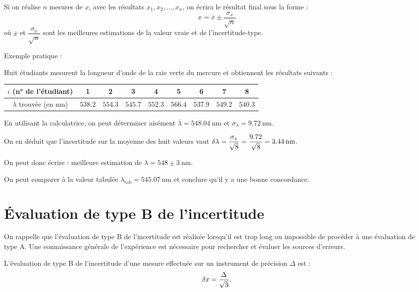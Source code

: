 Si on réalise \(n\) mesures de \(x\), avec les résultats \(x_1,x_2,\ldots,x_n\), on écrira le résultat final sous la forme : \[x=\overline{x}\pm\dfrac{\sigma_x}{\sqrt{n}}\] où \(\overline{x}\) et \(\dfrac{\sigma_x}{\sqrt{n}}\) sont les meilleures estimations de la valeur vraie et de l'incertitude-type.

Exemple pratique :

Huit étudiants mesurent la longueur d'onde de la raie verte du mercure et obtiennent les résultats suivants :

\begin{center}
\begin{tabular}{|c|c|c|c|c|c|c|c|c|}
\hline
\(i\) (n° de l'étudiant) & 1 & 2 & 3 & 4 & 5 & 6 & 7 & 8 \\
\hline
\(\lambda\) trouvée (en \(\unit{\nano\metre}\)) & \(\num{538.2}\) & \(\num{554.3}\) & \(\num{545.7}\) & \(\num{552.3}\) & \(\num{566.4}\) & \(\num{537.9}\) & \(\num{549.2}\) & \(\num{540.3}\) \\
\hline
\end{tabular}
\end{center}

En utilisant la calculatrice, on peut déterminer aisément \(\overline{\lambda}=\SI{548.04}{\nano\metre}\) et \(\sigma_\lambda=\SI{9.72}{\nano\metre}\).

On en déduit que l'incertitude sur la moyenne des huit valeurs vaut \(\fdif{\lambda}=\dfrac{\sigma_x}{\sqrt{8}}=\dfrac{\num{9.72}}{\sqrt{8}}=\SI{3.44}{\nano\metre}\).

On peut donc écrire : meilleure estimation de \(\lambda=548\pm\SI{3}{\nano\metre}\).

On peut comparer à la valeur tabulée \(\lambda_\text{tab}=\SI{545.07}{\nano\metre}\) et conclure qu'il y a une bonne concordance.

\section{Évaluation de type B de l'incertitude}

On rappelle que l'évaluation de type B de l'incertitude est réalisée lorsqu'il est trop long ou impossible de procéder à une évaluation de type A. Une connaissance générale de l'expérience est nécessaire pour rechercher et évaluer les sources d'erreurs.

L'évaluation de type B de l'incertitude d'une mesure effectuée sur un instrument de précision \(\Delta\) est : \[\fdif{x}=\dfrac{\Delta}{\sqrt{3}}.\]

